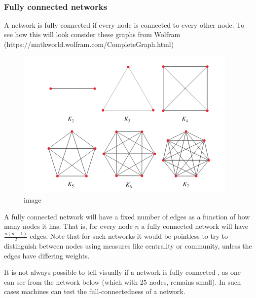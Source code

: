     \begin{center}
    \end{center}
    { \hspace*{\fill} \\}
    
    \hypertarget{fully-connected-networks}{%
\subsubsection{Fully connected
networks}\label{fully-connected-networks}}

A network is fully connected if every node is connected to every other
node. To see how this will look consider these graphs from Wolfram
(https://mathworld.wolfram.com/CompleteGraph.html)

\begin{figure}
\centering
\includegraphics{images/ch2/wolfram.png}
\caption{image}
\end{figure}

A fully connected network will have a fixed number of edges as a
function of how many nodes it has. That is, for every node \(n\) a fully
connected network will have $ \frac{n(n-1)}{2} $ edges. Note that for
such networks it would be pointless to try to distinguish between nodes
using measures like centrality or community, unless the edges have
differing weights.

    It is not always possible to tell visually if a network is fully
connected , as one can see from the network below (which with 25 nodes,
remains small). In such cases machines can test the full-connectedness
of a network.

